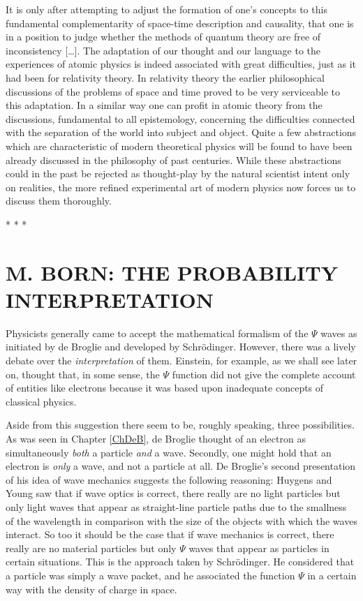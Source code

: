 It is only after attempting to adjust the formation of one's concepts
to this fundamental complementarity of space-time description and
causality, that one is in a position to judge whether the methods of
quantum theory are free of inconsistency [\ldots]. The adaptation of our
thought and our language to the experiences of atomic physics is indeed
associated with great difficulties, just as it had been for relativity
theory. In relativity theory the earlier philosophical discussions of
the problems of space and time proved to be very serviceable to this
adaptation. In a similar way one can profit in atomic theory from the
discussions, fundamental to all epistemology, concerning the
difficulties connected with the separation of the world into subject and
object. Quite a few abstractions which are characteristic of modern
theoretical physics will be found to have been already discussed in the
philosophy of past centuries. While these abstractions could in the past
be rejected as thought-play by the natural scientist intent only on
realities, the more refined experimental art of modern physics now
forces us to discuss them thoroughly.\\
\centerline{* * *}
%

\section*{M. BORN: THE PROBABILITY INTERPRETATION}

Physicists generally came to accept the mathematical formalism of the
$\Psi$ waves as initiated by de Broglie and developed by Schrödinger.
However, there was a lively debate over the \emph{interpretation} of
them. Einstein, for example, as we shall see later on, thought that, in
some sense, the $\Psi$ function did not give the complete account of
entities like electrons because it was based upon inadequate concepts of
classical physics.

Aside from this suggestion there seem to be, roughly speaking, three
possibilities. As was seen in Chapter \ref{ChDeB}, de Broglie thought of an
electron as simultaneously \emph{both} a particle \emph{and} a wave.
Secondly, one might hold that an electron is \emph{only} a wave, and not
a particle at all. De Broglie's second presentation of his idea of wave
mechanics suggests the following reasoning: Huygens and Young saw that
if wave optics is correct, there really are no light particles but only
light waves that appear as straight-line particle paths due to the
smallness of the wavelength in comparison with the size of the objects
with which the waves interact. So too it should be the case that if wave
mechanics is correct, there really are no material particles but only
$\Psi$ waves that appear as particles in certain situations. This is
the approach taken by Schrödinger. He considered that a particle was
simply a wave packet, and he associated the function $\Psi$ in a
certain way with the density of charge in space.

